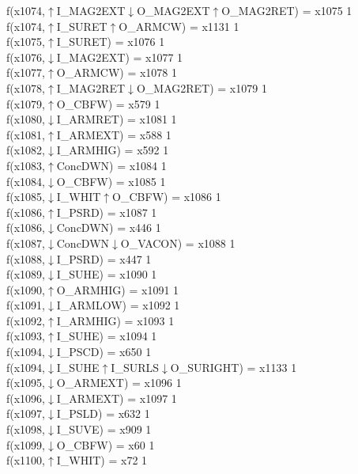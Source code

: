 f(x1074,$\uparrow$I\_MAG2EXT$\downarrow$O\_MAG2EXT$\uparrow$O\_MAG2RET) = x1075 {1} \\
f(x1074,$\uparrow$I\_SURET$\uparrow$O\_ARMCW) = x1131 {1} \\
f(x1075,$\uparrow$I\_SURET) = x1076 {1} \\
f(x1076,$\downarrow$I\_MAG2EXT) = x1077 {1} \\
f(x1077,$\uparrow$O\_ARMCW) = x1078 {1} \\
f(x1078,$\uparrow$I\_MAG2RET$\downarrow$O\_MAG2RET) = x1079 {1} \\
f(x1079,$\uparrow$O\_CBFW) = x579 {1} \\
f(x1080,$\downarrow$I\_ARMRET) = x1081 {1} \\
f(x1081,$\uparrow$I\_ARMEXT) = x588 {1} \\
f(x1082,$\downarrow$I\_ARMHIG) = x592 {1} \\
f(x1083,$\uparrow$ConcDWN) = x1084 {1} \\
f(x1084,$\downarrow$O\_CBFW) = x1085 {1} \\
f(x1085,$\downarrow$I\_WHIT$\uparrow$O\_CBFW) = x1086 {1} \\
f(x1086,$\uparrow$I\_PSRD) = x1087 {1} \\
f(x1086,$\downarrow$ConcDWN) = x446 {1} \\
f(x1087,$\downarrow$ConcDWN$\downarrow$O\_VACON) = x1088 {1} \\
f(x1088,$\downarrow$I\_PSRD) = x447 {1} \\
f(x1089,$\downarrow$I\_SUHE) = x1090 {1} \\
f(x1090,$\uparrow$O\_ARMHIG) = x1091 {1} \\
f(x1091,$\downarrow$I\_ARMLOW) = x1092 {1} \\
f(x1092,$\uparrow$I\_ARMHIG) = x1093 {1} \\
f(x1093,$\uparrow$I\_SUHE) = x1094 {1} \\
f(x1094,$\downarrow$I\_PSCD) = x650 {1} \\
f(x1094,$\downarrow$I\_SUHE$\uparrow$I\_SURLS$\downarrow$O\_SURIGHT) = x1133 {1} \\
f(x1095,$\downarrow$O\_ARMEXT) = x1096 {1} \\
f(x1096,$\downarrow$I\_ARMEXT) = x1097 {1} \\
f(x1097,$\downarrow$I\_PSLD) = x632 {1} \\
f(x1098,$\downarrow$I\_SUVE) = x909 {1} \\
f(x1099,$\downarrow$O\_CBFW) = x60 {1} \\
f(x1100,$\uparrow$I\_WHIT) = x72 {1} \\

